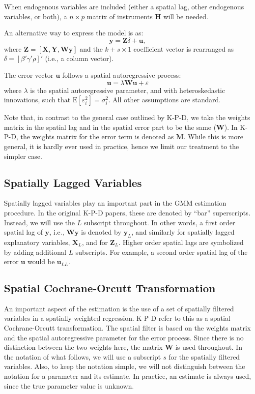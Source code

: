 \documentclass{article}
\begin{document}
When endogenous variables are included
(either a spatial lag, other endogenous variables, or both), a $n \times p$ matrix of instruments $\mathbf{H}$ will be needed.

An alternative way to express the model is as:
\begin{equation}\label{eq:generic}
\mathbf{y} = \mathbf{Z} \delta + \mathbf{u},
\end{equation}
where $\mathbf{Z} = [ \mathbf{X}, \mathbf{Y}, \mathbf{Wy} ]$ and the $k + s \times 1$ coefficient
vector is rearranged as $\delta = [\beta' \gamma'  \rho ]'$ (i.e., a column vector).

The error vector $\mathbf{u}$ follows a spatial autoregressive process:
\begin{equation*}
    \mathbf{u} = \lambda \mathbf{W u} + \varepsilon
    \label{model2}
\end{equation*}
where $\lambda$ is the spatial autoregressive parameter, and with heteroskedastic 
innovations, such that $\mbox{E}[\varepsilon_i^2] = \sigma_i^2$. All other assumptions
are standard.


Note that, in contrast to the general case outlined by K-P-D, we take the weights
matrix in the spatial lag and in the spatial error part to be the same ($\mathbf{W}$). In K-P-D, the
weights matrix for the error term is denoted as $\mathbf{M}$. While this is more
general, it is hardly ever used in practice, hence we limit our treatment to the
simpler case.

\subsection{Spatially Lagged Variables}
Spatially lagged variables play an important part in the GMM estimation procedure.
In the original K-P-D papers, these are denoted by ``bar'' superscripts. Instead, we will
use the $L$ subscript throughout. In other words, a first order spatial lag of $\mathbf{y}$, 
i.e., $\mathbf{Wy}$ is denoted by $\mathbf{y}_L$, and similarly for spatially lagged
explanatory variables, $\mathbf{X}_L$, and for $\mathbf{Z}_L$. Higher order spatial lags
are symbolized by adding additional $L$ subscripts. For example, a second order 
spatial lag of the error $\mathbf{u}$ would be $\mathbf{u}_{LL}$.


\subsection{Spatial Cochrane-Orcutt Transformation}
An important aspect of the estimation is the use of a set of spatially filtered variables
in a spatially weighted regression. K-P-D refer to this as a spatial Cochrane-Orcutt transformation.
The spatial filter is based on the weights matrix  and the
spatial autoregressive parameter for the error process. Since there is no
distinction between the two weights here, the matrix $\mathbf{W}$ is used throughout.
In the notation of what follows, we will use a subscript $s$ for the spatially filtered variables. Also, to keep the notation simple, we will not distinguish between the notation
for a parameter and its estimate. In practice, an estimate is always used, since the true
parameter value is unknown.
\end{document}
